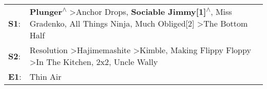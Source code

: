 \begin{supertabular}{p{0.03\textwidth}p{0.92\textwidth}}
 \textbf{S1}:  &  \textbf{Plunger\textsuperscript{$\wedge$}} \textgreater \enspace Anchor Drops\textsuperscript{}, \enspace \textbf{Sociable Jimmy[1]\textsuperscript{$\wedge$}}, \enspace Miss Gradenko\textsuperscript{}, \enspace All Things Ninja\textsuperscript{}, \enspace Much Obliged[2]\textsuperscript{} \textgreater \enspace The Bottom Half\textsuperscript{}  \enspace  \\
 \textbf{S2}:  &                                          Resolution\textsuperscript{} \textgreater \enspace Hajimemashite\textsuperscript{} \textgreater \enspace Kimble\textsuperscript{}, \enspace Making Flippy Floppy\textsuperscript{} \textgreater \enspace In The Kitchen\textsuperscript{}, \enspace 2x2\textsuperscript{}, \enspace Uncle Wally\textsuperscript{}  \enspace  \\
 \textbf{E1}:  &                                                                                                                                                                                                                                                                                                                                 Thin Air\textsuperscript{}  \enspace  \\
\end{supertabular}
